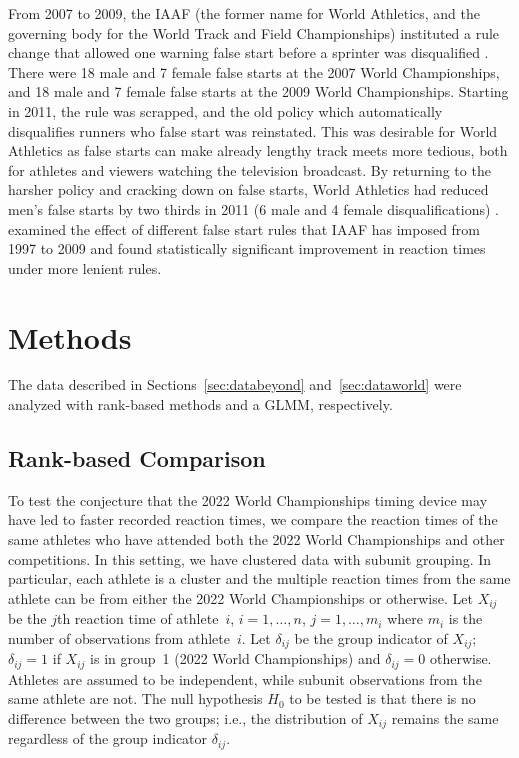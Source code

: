\documentclass[12pt, letterpaper]{article}
\begin{document}
From 2007 to 2009, the IAAF (the former name for World Athletics, and the 
governing body for the World Track and Field Championships) instituted a rule 
change that allowed one warning false start before a sprinter was disqualified 
\citep{iaaf2009falsestart}. There were 18 male and 7 female false starts at the 
2007 World Championships, and 18 male and 7 female false starts at the 2009 World 
Championships. Starting in 2011, the rule was scrapped, and the old policy which
automatically disqualifies runners who false start was reinstated. This was 
desirable for World Athletics as false starts can make already lengthy track 
meets more tedious, both for athletes and viewers watching the television 
broadcast. By returning to the harsher policy and cracking down on false starts,
World Athletics had reduced men's false starts by two thirds in 2011 (6 male and
4 female disqualifications) \citep{iaaf2009falsestart}. \citet{haugen2013effect}
examined the effect of different false start rules that IAAF has imposed from 
1997 to 2009 and found statistically significant improvement in reaction times 
under more lenient rules.



\section{Methods} \label{sec:Methods}

The data described in Sections~\ref{sec:databeyond} and~\ref{sec:dataworld} were
analyzed with rank-based methods and a GLMM, respectively.


\subsection{Rank-based Comparison}\label{sec:rank}


To test the conjecture that the 2022 World Championships timing device may have 
led to faster recorded reaction times, we compare the reaction times of the same
athletes who have attended both the 2022 World Championships and other 
competitions. 
In this setting, we have clustered data with subunit grouping. In particular,
each athlete is a cluster and the multiple reaction times from the same athlete
can be from either the 2022 World Championships or otherwise.
Let $X_{ij}$ be the $j$th reaction time of athlete~$i$, $i = 1, \ldots, n$,
$j = 1, \ldots, m_i$ where $m_i$ is the number of observations from
athlete~$i$. Let $\delta_{ij}$ be the group indicator of $X_{ij}$; $\delta_{ij}
= 1$ if $X_{ij}$ is in group~1 (2022 World Championships) and $\delta_{ij} = 0$ 
otherwise. Athletes are
assumed to be independent, while subunit observations from the same athlete are
not. The null hypothesis $H_0$ to be tested is that there is no difference
between the two groups; i.e., the distribution of $X_{ij}$ remains the same
regardless of the group indicator $\delta_{ij}$.
\end{document}
